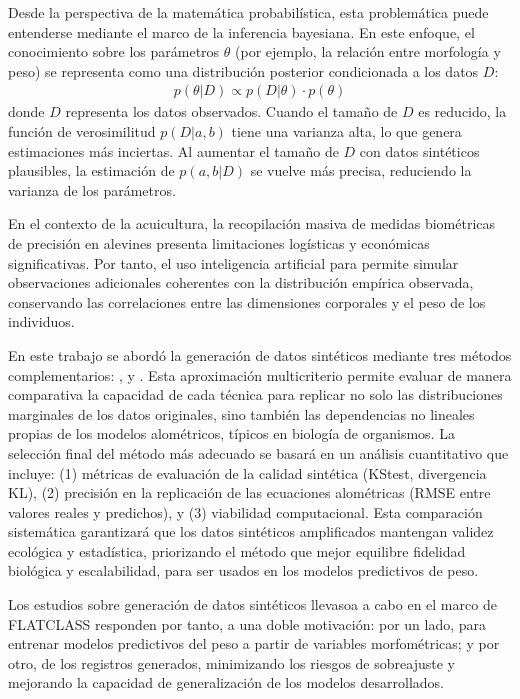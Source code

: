 \documentclass[a4paper,10pt,spanish]{jupyterBook}
\begin{document}
\sphinxAtStartPar
Desde la perspectiva de la matemática probabilística, esta problemática puede entenderse mediante el marco de la inferencia bayesiana. En este enfoque, el conocimiento sobre los parámetros \(\theta\) (por ejemplo, la relación entre morfología y peso) se representa como una distribución posterior condicionada a los datos \(D\):
\begin{equation*}
\begin{split}
p(\theta | D) \propto p(D | \theta) \cdot p(\theta)
\end{split}
\end{equation*}
\sphinxAtStartPar
donde \(D\) representa los datos observados. Cuando el tamaño de \(D\) es reducido, la función de verosimilitud \(p(D|a,b)\) tiene una varianza alta, lo que genera estimaciones más inciertas. Al aumentar el tamaño de \(D\) con datos sintéticos plausibles, la estimación de \(p(a,b|D)\) se vuelve más precisa, reduciendo la varianza de los parámetros.

\sphinxAtStartPar
En el contexto de la acuicultura, la recopilación masiva de medidas biométricas de precisión en alevines presenta limitaciones logísticas y económicas significativas. Por tanto, el uso inteligencia artificial para permite simular observaciones adicionales coherentes con la distribución empírica observada, conservando las correlaciones entre las dimensiones corporales y el peso de los individuos.

\sphinxAtStartPar
En este trabajo se abordó la generación de datos sintéticos mediante tres métodos complementarios: ,  y . Esta aproximación multicriterio permite evaluar de manera comparativa la capacidad de cada técnica para replicar no solo las distribuciones marginales de los datos originales, sino también las dependencias no lineales propias de los modelos alométricos, típicos en biología de organismos. La selección final del método más adecuado se basará en un análisis cuantitativo que incluye: (1) métricas de evaluación de la calidad sintética (KS\sphinxhyphen{}test, divergencia KL), (2) precisión en la replicación de las ecuaciones alométricas (RMSE entre valores reales y predichos), y (3) viabilidad computacional. Esta comparación sistemática garantizará que los datos sintéticos amplificados mantengan validez ecológica y estadística, priorizando el método que mejor equilibre fidelidad biológica y escalabilidad, para ser usados en los modelos predictivos de peso.

\sphinxAtStartPar
Los estudios sobre generación de datos sintéticos llevasoa a cabo en el marco de FLATCLASS responden por tanto, a una doble motivación: por un lado,  para entrenar modelos predictivos del peso a partir de variables morfométricas; y por otro,  de los registros generados, minimizando los riesgos de sobreajuste y mejorando la capacidad de generalización de los modelos desarrollados.
\end{document}
